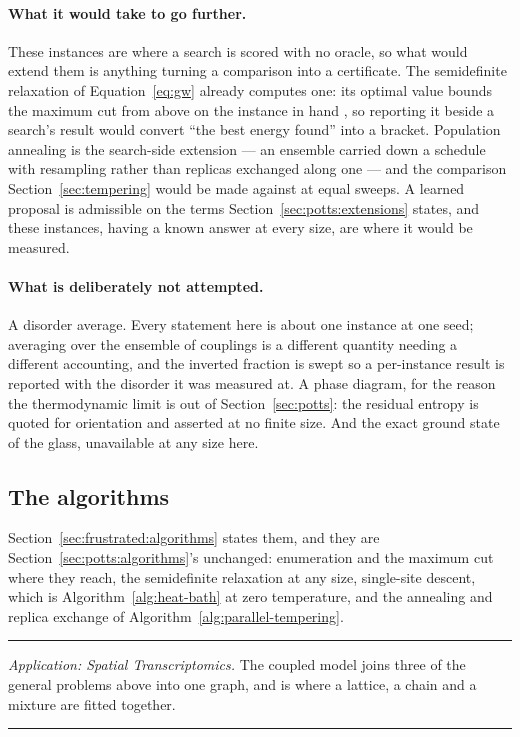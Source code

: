 \documentclass[11pt,a4paper]{article}
\begin{document}
\paragraph{What it would take to go further.}
These instances are where a search is scored with no oracle, so what would
extend them is anything turning a comparison into a certificate. The
semidefinite relaxation of Equation~\ref{eq:gw} already computes one: its
optimal value bounds the maximum cut from above on the instance in hand
\citep{goemans1995, boyd2004}, so reporting it beside a search's result would
convert ``the best energy found'' into a bracket. Population annealing is the
search-side extension --- an ensemble carried down a schedule with resampling
rather than replicas exchanged along one \citep{machta2010} --- and the
comparison Section~\ref{sec:tempering} would be made against at equal sweeps. A
learned proposal is admissible on the terms
Section~\ref{sec:potts:extensions} states, and these instances, having a known
answer at every size, are where it would be measured.

\paragraph{What is deliberately not attempted.}
A disorder average. Every statement here is about one instance at one seed;
averaging over the ensemble of couplings is a different quantity needing a
different accounting, and the inverted fraction is swept so a per-instance
result is reported with the disorder it was measured at. A phase diagram, for
the reason the thermodynamic limit is out of Section~\ref{sec:potts}: the
residual entropy is quoted for orientation and asserted at no finite size. And
the exact ground state of the glass, unavailable at any size here.

\subsection{The algorithms}
Section~\ref{sec:frustrated:algorithms} states them, and they
are Section~\ref{sec:potts:algorithms}'s unchanged: enumeration and the maximum
cut where they reach, the semidefinite relaxation at any size, single-site
descent, which is Algorithm~\ref{alg:heat-bath} at zero temperature, and the
annealing and replica exchange of Algorithm~\ref{alg:parallel-tempering}.

\begin{center}\rule{0.45\linewidth}{0.4pt}\end{center}
\noindent\textit{Application: Spatial Transcriptomics.} The coupled model joins three of the
general problems above into one graph, and is where a lattice, a chain and a
mixture are fitted together.
\begin{center}\rule{0.45\linewidth}{0.4pt}\end{center}
\end{document}
